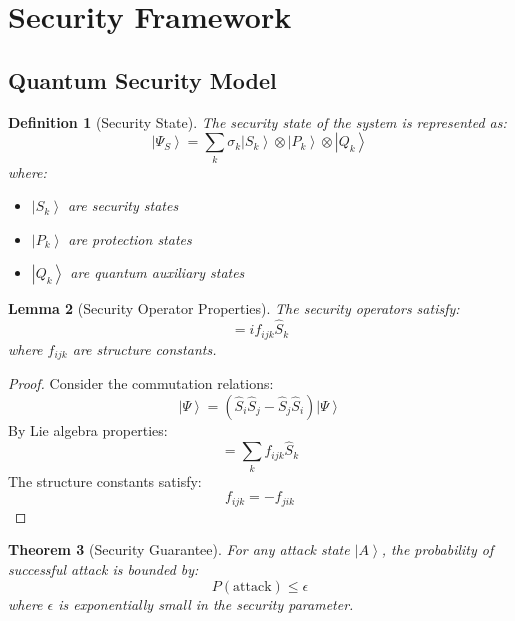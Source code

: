 \documentclass[12pt]{article}
\newcommand{\ket}[1]{\left|#1\right\rangle}
\newcommand{\op}[1]{\hat{#1}}
\newtheorem{theorem}{Theorem}[section]
\newtheorem{lemma}[theorem]{Lemma}
\newtheorem{definition}[theorem]{Definition}
\begin{document}
\section{Security Framework}
\subsection{Quantum Security Model}
\begin{definition}[Security State]
The security state of the system is represented as:
\begin{equation}
\ket{\Psi_S} = \sum_k \sigma_k\ket{S_k} \otimes \ket{P_k} \otimes \ket{Q_k}
\end{equation}
where:
\begin{itemize}
\item $\ket{S_k}$ are security states
\item $\ket{P_k}$ are protection states
\item $\ket{Q_k}$ are quantum auxiliary states
\end{itemize}
\end{definition}
\begin{lemma}[Security Operator Properties]
The security operators satisfy:
\begin{equation}
[\op{S}_i,\op{S}_j] = if_{ijk}\op{S}_k
\end{equation}
where $f_{ijk}$ are structure constants.
\end{lemma}
\begin{proof}
Consider the commutation relations:
\begin{equation}
[\op{S}_i,\op{S}_j]\ket{\Psi} = (\op{S}_i\op{S}_j - \op{S}_j\op{S}_i)\ket{\Psi}
\end{equation}
By Lie algebra properties:
\begin{equation}
[\op{S}_i,\op{S}_j] = \sum_k f_{ijk}\op{S}_k
\end{equation}
The structure constants satisfy:
\begin{equation}
f_{ijk} = -f_{jik}
\end{equation}
\end{proof}
\begin{theorem}[Security Guarantee]
For any attack state $\ket{A}$, the probability of successful attack is bounded by:
\begin{equation}
P(\text{attack}) \leq \epsilon
\end{equation}
where $\epsilon$ is exponentially small in the security parameter.
\end{theorem}
\end{document}
